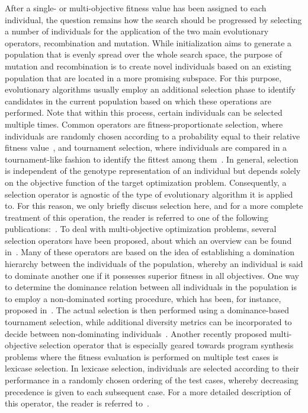After a single- or multi-objective fitness value has been assigned to each individual, the question remains how the search should be progressed by selecting a number of individuals for the application of the two main evolutionary operators, recombination and mutation.
While initialization aims to generate a population that is evenly spread over the whole search space, the purpose of mutation and recombination is to create novel individuals based on an existing population that are located in a more promising subspace.  
For this purpose, evolutionary algorithms usually employ an additional selection phase to identify candidates in the current population based on which these operations are performed.
Note that within this process, certain individuals can be selected multiple times.
Common operators are fitness-proportionate selection, where individuals are randomly chosen according to a probability equal to their relative fitness value~\cite{lipowski2012roulette}, and tournament selection, where individuals are compared in a tournament-like fashion to identify the fittest among them~\cite{fang2010review}.
In general, selection is independent of the genotype representation of an individual but depends solely on the objective function of the target optimization problem.
Consequently, a selection operator is agnostic of the type of evolutionary algorithm it is applied to. 
For this reason, we only briefly discuss selection here, and for a more complete treatment of this operation, the reader is referred to one of the following publications:~\cite{back1997handbook,beyer2002evolution,goldberg1991comparative}.
To deal with multi-objective optimization problems, several selection operators have been proposed, about which an overview can be found in~\cite{coello2007evolutionary,deb2011multi,deb2015multi}.
Many of these operators are based on the idea of establishing a domination hierarchy between the individuals of the population, whereby an individual is said to dominate another one if it possesses superior fitness in all objectives.
One way to determine the dominance relation between all individuals in the population is to employ a non-dominated sorting procedure, which has been, for instance, proposed in~\cite{deb2002fast,deb2013evolutionary}.
The actual selection is then performed using a dominance-based tournament selection, while additional diversity metrics can be incorporated to decide between non-dominating individuals~\cite{coello2007evolutionary}.
Another recently proposed multi-objective selection operator that is especially geared towards program synthesis problems where the fitness evaluation is performed on multiple test cases is lexicase selection.
In lexicase selection, individuals are selected according to their performance in a randomly chosen ordering of the test cases, whereby decreasing precedence is given to each subsequent case. 
For a more detailed description of this operator, the reader is referred to~\cite{helmuth2014solving,la2016epsilon}.
 
